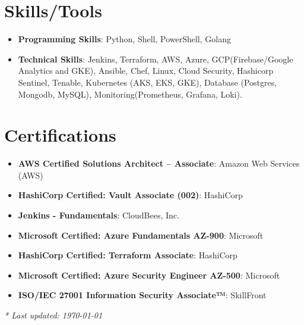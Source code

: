 \documentclass[letterpaper,11pt]{article}
\newcommand{\resumeItem}[2]{
  \item\small{
    \textbf{#1}{: #2 \vspace{-2pt}}
  }
}
\newcommand{\resumeSubItem}[2]{\resumeItem{#1}{#2}\vspace{-4pt}}
\newcommand{\resumeSubHeadingListStart}{\begin{itemize}[leftmargin=*]}
\newcommand{\resumeSubHeadingListEnd}{\end{itemize}}
\begin{document}
\section{Skills/Tools}
\resumeSubHeadingListStart
  \resumeSubItem{Programming Skills}
    {Python, Shell, PowerShell, Golang}
  \resumeSubItem{Technical Skills}
    {Jenkins, Terraform, AWS, Azure, GCP(Firebase/Google Analytics and GKE), Ansible, Chef, Linux, Cloud Security, Hashicorp Sentinel, Tenable, Kubernetes (AKS, EKS, GKE), Database (Postgres, Mongodb, MySQL), Monitoring(Prometheus, Grafana, Loki).}
\resumeSubHeadingListEnd

\section{Certifications}
\resumeSubHeadingListStart
  \resumeSubItem{AWS Certified Solutions Architect – Associate}
    {Amazon Web Services (AWS)}
  \resumeSubItem{HashiCorp Certified: Vault Associate (002)}
    {HashiCorp}
  \resumeSubItem{Jenkins - Fundamentals}
    {CloudBees, Inc. }
  \resumeSubItem{Microsoft Certified: Azure Fundamentals AZ-900}
    {Microsoft}
  \resumeSubItem{HashiCorp Certified: Terraform Associate}
    {HashiCorp}
  \resumeSubItem{Microsoft Certified: Azure Security Engineer AZ-500}
    {Microsoft}
  \resumeSubItem{ISO/IEC 27001 Information Security Associate™}
    {SkillFront}
\resumeSubHeadingListEnd

\vfill
\textit{* Last updated: \today}
\end{document}
